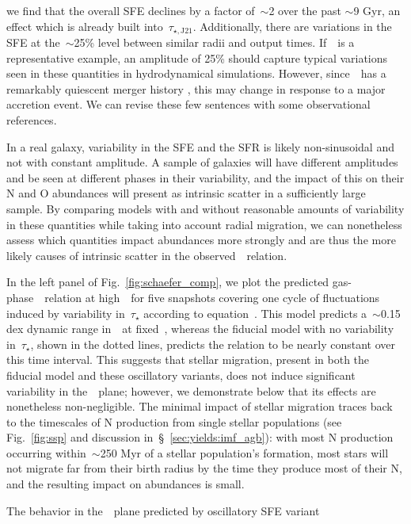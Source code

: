 \documentclass[ms.tex]{subfiles}
\begin{document}
we find that the overall SFE declines by a factor of~$\sim$2 over the past
$\sim$9 Gyr, an effect which is already built into~$\tau_{\star,\text{J21}}$.
Additionally, there are variations in the SFE at the~$\sim$25\% level between
similar radii and output times.
If~\hsim~is a representative example, an amplitude of 25\% should capture
typical variations seen in these quantities in hydrodynamical simulations.
However, since~\hsim~has a remarkably quiescent merger history
\citep{Zolotov2012}, this may change in response to a major accretion event.
{\color{red} We can revise these few sentences with some observational
references.}
\par
In a real galaxy, variability in the SFE and the SFR is likely non-sinusoidal
and not with constant amplitude.
A sample of galaxies will have different amplitudes and be seen at different
phases in their variability, and the impact of this on their N and O abundances
will present as intrinsic scatter in a sufficiently large sample.
By comparing models with and without reasonable amounts of variability in these
quantities while taking into account radial migration, we can nonetheless
assess which quantities impact abundances more strongly and are thus the more
likely causes of intrinsic scatter in the observed~\ohno~relation.
\par
In the left panel of Fig.~\ref{fig:schaefer_comp}, we plot the predicted
gas-phase~\ohno~relation at high~\oh~for five snapshots covering one cycle of
fluctuations induced by variability in~$\tau_\star$ according to
equation~.
This model predicts a~$\sim$0.15 dex dynamic range in~\no~at fixed~\oh, whereas
the fiducial model with no variability in~$\tau_\star$, shown in the dotted
lines, predicts the relation to be nearly constant over this time interval.
This suggests that stellar migration, present in both the fiducial model and
these oscillatory variants, does not induce significant variability in
the~\ohno~plane; however, we demonstrate below that its effects are nonetheless
non-negligible.
The minimal impact of stellar migration traces back to the timescales of N
production from single stellar populations (see Fig.~\ref{fig:ssp} and
discussion in~\S~\ref{sec:yields:imf_agb}): with most N production occurring
within~$\sim$250 Myr of a stellar population's formation, most stars will not
migrate far from their birth radius by the time they produce most of their N,
and the resulting impact on abundances is small.
\par
The behavior in the~\ohno~plane predicted by oscillatory SFE variant
\end{document}
